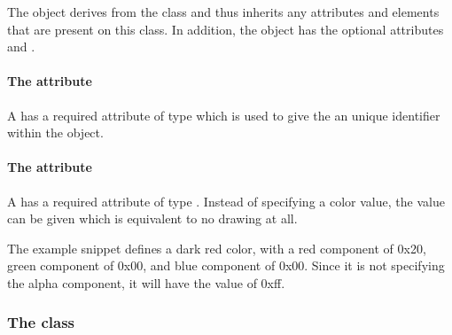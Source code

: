 The \ColorDefinition object derives from the \SBase class and thus
inherits any attributes and elements that are present on this class.
In addition, the \ColorDefinition object has the optional attributes  and .

\paragraph{The \fixttspace{} attribute}

A \ColorDefinition has a required attribute  of type
 which is used to give the \ColorDefinition an unique identifier within the \RenderInformation object.

\paragraph{The \fixttspace{} attribute}

A \ColorDefinition has a required attribute  of type
. Instead of 
specifying a color value, the value  can be given which is equivalent to 
no drawing at all.

The example snippet defines a dark red color, with a red component of 0x20, green 
component of 0x00, and blue component of 0x00. Since it is not specifying the alpha 
component, it will have the value of 0xff. 

{\footnotesize
{}
}


\subsubsection{The  class}
\label{gradientbase-class}

